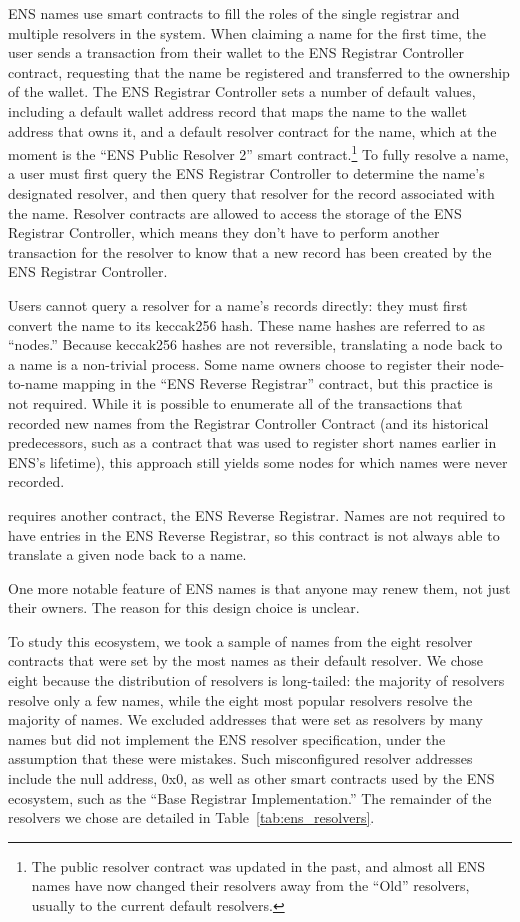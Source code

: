 ENS names use smart contracts to fill the roles of the single registrar and 
multiple resolvers in the system. When claiming a name for the first 
time, the user sends a transaction from their wallet to the ENS Registrar 
Controller 
contract, requesting that the name be registered and transferred to the 
ownership of the wallet. The ENS Registrar Controller sets a number of default 
values, including a default wallet 
address record that maps the name to the wallet address that owns it, and a 
default resolver contract for the 
name, which at the moment is the ``ENS Public Resolver 2'' smart 
contract.\footnote{The public 
	resolver contract was updated in the past, and almost all ENS names have 
	now 
	changed their resolvers away
	from the ``Old'' resolvers, usually to the current default resolvers.} To 
	fully 
resolve a 
name, a user must first query the ENS Registrar Controller to determine the 
name's designated resolver, and then query that resolver for the record 
associated with the name. Resolver contracts are allowed to access the storage 
of the ENS Registrar Controller, which means they don't have to perform another 
transaction for the resolver to know that a new record has been created by the 
ENS Registrar Controller. 

Users cannot query a resolver for a name's records directly: they must first 
convert the name to its keccak256 hash. These 
name hashes are referred to as ``nodes.'' Because keccak256 hashes are not 
reversible, 
translating a node back to a name is a non-trivial process. Some name owners 
choose to register their node-to-name mapping in the ``ENS Reverse Registrar'' 
contract, but this practice is not required. While it is possible to enumerate 
all of the transactions that recorded new names from the Registrar Controller 
Contract (and its historical predecessors, such as a contract that was used to 
register short names earlier in ENS's lifetime), this approach still yields some
nodes for which names were never recorded. 

requires another contract, the ENS Reverse 
Registrar. Names are not required to have entries in the ENS Reverse Registrar, 
so this contract is not always able to translate a given node 
back to a name. 

One more notable feature of ENS names is that anyone may renew 
them, not just their owners. The reason for this design choice 
is unclear.

To study this ecosystem, we took a sample of names from the eight resolver 
contracts that were set by the most names as their default resolver. We chose 
eight because the distribution of resolvers is long-tailed: the majority of 
resolvers resolve only a few names, while the eight most popular resolvers 
resolve the majority of names. We excluded addresses that were set as resolvers 
by many names but did not implement the ENS resolver specification, under the 
assumption that these were mistakes. Such misconfigured resolver addresses 
include the null address, 
0x0, as well as other smart contracts used by the ENS ecosystem, such as the 
``Base Registrar Implementation.''  The remainder of the resolvers we chose are 
detailed in Table~\ref{tab:ens_resolvers}.

